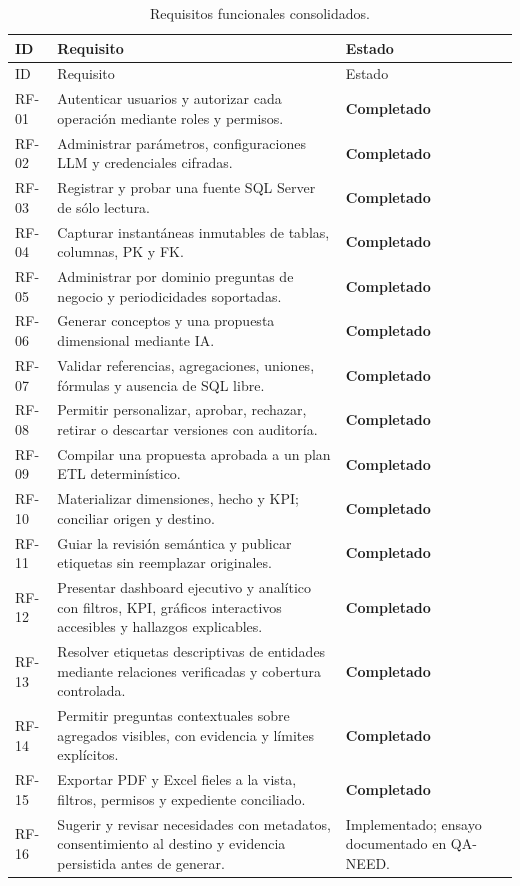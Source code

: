 \documentclass[11pt,letterpaper]{article}
\newcommand{\ok}{\textcolor{success}{\textbf{Completado}}}
\begin{document}
\begin{longtable}{@{}p{}p{}p{}@{}}
  \caption{Requisitos funcionales consolidados.}\\
  \toprule
  ID & Requisito & Estado \\
  \midrule
  \endfirsthead
  \toprule
  ID & Requisito & Estado \\
  \midrule
  \endhead
  RF-01 & Autenticar usuarios y autorizar cada operación mediante roles y permisos. & \ok \\
  RF-02 & Administrar parámetros, configuraciones LLM y credenciales cifradas. & \ok \\
  RF-03 & Registrar y probar una fuente SQL Server de sólo lectura. & \ok \\
  RF-04 & Capturar instantáneas inmutables de tablas, columnas, PK y FK. & \ok \\
  RF-05 & Administrar por dominio preguntas de negocio y periodicidades soportadas. & \ok \\
  RF-06 & Generar conceptos y una propuesta dimensional mediante IA. & \ok \\
  RF-07 & Validar referencias, agregaciones, uniones, fórmulas y ausencia de SQL libre. & \ok \\
  RF-08 & Permitir personalizar, aprobar, rechazar, retirar o descartar versiones con auditoría. & \ok \\
  RF-09 & Compilar una propuesta aprobada a un plan ETL determinístico. & \ok \\
  RF-10 & Materializar dimensiones, hecho y KPI; conciliar origen y destino. & \ok \\
  RF-11 & Guiar la revisión semántica y publicar etiquetas sin reemplazar originales. & \ok \\
  RF-12 & Presentar dashboard ejecutivo y analítico con filtros, KPI, gráficos interactivos accesibles y hallazgos explicables. & \ok \\
  RF-13 & Resolver etiquetas descriptivas de entidades mediante relaciones verificadas y cobertura controlada. & \ok \\
  RF-14 & Permitir preguntas contextuales sobre agregados visibles, con evidencia y límites explícitos. & \ok \\
  RF-15 & Exportar PDF y Excel fieles a la vista, filtros, permisos y expediente conciliado. & \ok \\
  RF-16 & Sugerir y revisar necesidades con metadatos, consentimiento al destino y evidencia persistida antes de generar. & Implementado; ensayo documentado en QA-NEED. \\
  \bottomrule
\end{longtable}
\end{document}
